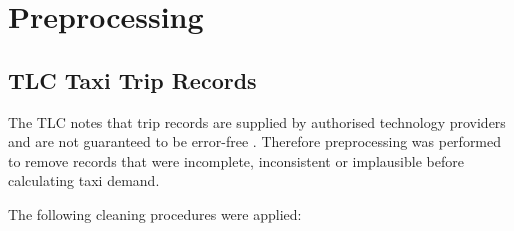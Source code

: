 \documentclass[11pt]{article}
\begin{document}

\section{Preprocessing}


\subsection{TLC Taxi Trip Records}

The TLC notes that trip records are supplied by authorised technology providers and are not guaranteed 
to be error-free \cite{nyctlc_tripdata}. Therefore preprocessing was performed to remove records that 
were incomplete, inconsistent or implausible before calculating taxi demand.

The following cleaning procedures were applied:
\end{document}
